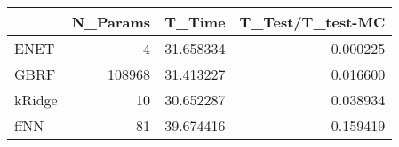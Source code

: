 \begin{tabular}{lrrr}
\toprule
{} &  N\_Params &     T\_Time &  T\_Test/T\_test-MC \\
\midrule
ENET   &         4 &  31.658334 &          0.000225 \\
GBRF   &    108968 &  31.413227 &          0.016600 \\
kRidge &        10 &  30.652287 &          0.038934 \\
ffNN   &        81 &  39.674416 &          0.159419 \\
\bottomrule
\end{tabular}
